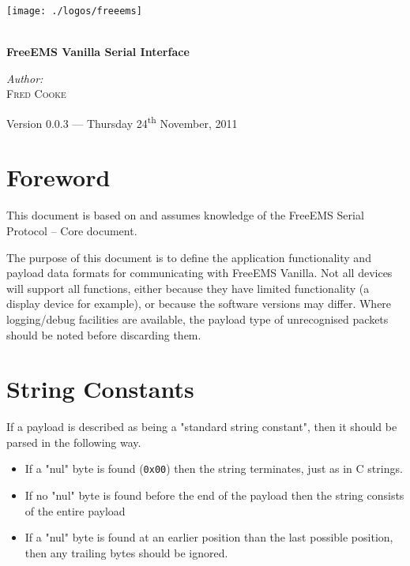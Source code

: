 \documentclass[12pt,a4paper,titlepage]{article}
\begin{document}
\begin{titlepage} 
\begin{center}

\texttt{[image: ./logos/freeems]}\\[1cm] \vfill

\HRule \\[0.8cm]
{ \huge \bfseries FreeEMS Vanilla Serial Interface }\\[0.4cm]
\HRule \vfill

\Large \emph{Author:}\\
\textsc{Fred Cooke} \vfill

{\large Version 0.0.3 --- Thursday 24\textsuperscript{th} November, 2011}

\end{center}
\end{titlepage} 





\section{Foreword}

This document is based on and assumes knowledge of the FreeEMS Serial Protocol -- Core document.

The purpose of this document is to define the application functionality and payload data formats for communicating with FreeEMS Vanilla. Not all devices will support all functions, either because they have limited functionality (a display device for example), or because the software versions may differ. Where logging/debug facilities are available, the payload type of unrecognised packets should be noted before discarding them.




\section{String Constants}

If a payload is described as being a "standard string constant", then it should be parsed in the following way.

\begin{itemize}
\item If a "nul" byte is found (\texttt{0x00}) then the string terminates, just as in C strings.
\item If no "nul" byte is found before the end of the payload then the string consists of the entire payload
\item If a "nul" byte is found at an earlier position than the last possible position, then any trailing bytes  should be ignored.
\end{itemize}
\end{document}

